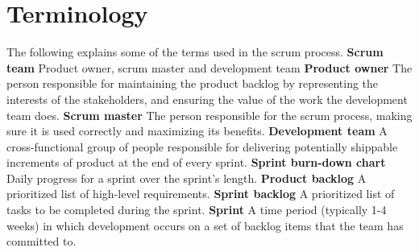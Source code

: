\documentclass[hidelinks, 12pt, oneside]{article}
\begin{document}
 	\section{Terminology}
 	The following explains some of the terms used in the scrum process.\newline\newline
 	\textbf{Scrum team}\newline
 	Product owner, scrum master and development team\newline\newline
 	\textbf{Product owner}\newline
 	The person responsible for maintaining the product backlog by representing the interests of the stakeholders, and ensuring the value of the work the development team does.\newline\newline
 	\textbf{Scrum master}\newline
 	The person responsible for the scrum process, making sure it is used correctly and maximizing its benefits.\newline\newline
 	\textbf{Development team}\newline
 	A cross-functional group of people responsible for delivering potentially shippable increments of product at the end of every sprint.\newline\newline
 	\textbf{Sprint burn-down chart}\newline
 	Daily progress for a sprint over the sprint's length.\newline\newline
 	\textbf{Product backlog}\newline
 	A prioritized list of high-level requirements.\newline\newline
 	\textbf{Sprint backlog}\newline
 	A prioritized list of tasks to be completed during the sprint.\newline\newline
 	\textbf{Sprint}\newline
 	A time period (typically 1-4 weeks) in which development occurs on a set of backlog items that the team has committed to.
 	
\end{document}
